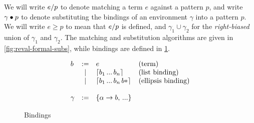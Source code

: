 We will write $e / p$ to denote matching a term $e$ against a
pattern $p$, and write $\gamma \bullet p$ to denote substituting the
bindings of an environment $\gamma$ into a pattern $p$.  We will write
$e \geq p$ to mean that $e / p$ is defined, and $\gamma_1 \cup
\gamma_2$ for the \emph{right-biased} union of $\gamma_1$ and
$\gamma_2$. The matching and substitution algorithms are given in
\cref{fig:reval-formal-subs}, while bindings are defined in
\cref{fig:reval-formal-bind}.

\begin{figure}[t]
\[\begin{array}{lcll}
b &:=& e                &\text{(term)} \\
  &|&  \lceil b_1 \,...\, b_n \rceil  &\text{(list binding)} \\
  &|&  \lceil b_1 \,...\, b_n\,b* \rceil &\text{(ellipsis binding)} \\ \\
\gamma &:=& \{\alpha \to b,\,...\} \\
\end{array}\]
\caption{Bindings}
\label{fig:reval-formal-bind}
\end{figure}

